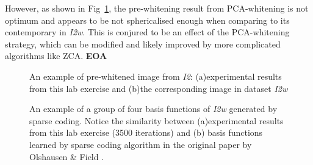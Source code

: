 \documentclass[11pt, twocolumn]{article}
\begin{document}
However, as shown in Fig~\ref{fig:b1}, the pre-whitening result from PCA-whitening is not optimum and appears to be not sphericalised enough when comparing to its contemporary in \textit{I2w}. This is conjured to be an effect of the PCA-whitening strategy, which can be modified and likely improved by more complicated algorithms like ZCA. \textbf{EOA}
\begin{figure}[ht]
    \centering
    \caption{An example of pre-whitened image from \textit{I2}: (a)experimental results from this lab exercise and (b)the corresponding image in dataset \textit{I2w}}
    \label{fig:b1}
\end{figure}

\begin{figure}[ht]
    \centering
    \caption{An example of a group of four basis functions of \textit{I2w} generated by sparse coding. Notice the similarity between (a)experimental results from this lab exercise (3500 iterations) and (b) basis functions learned by sparse coding algorithm in the original paper by Olshausen \& Field \cite{olshausen_1997_sparse}.}
    \label{fig:11}
\end{figure}
\end{document}
